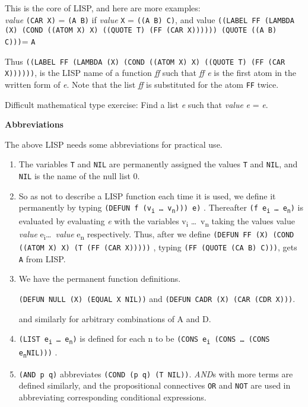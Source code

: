 \documentclass[8pt,letter,twocolumn]{article}
\newcommand{\args}[1] {#1\textsubscript{i} \dots \ #1\textsubscript{n}}
\newcommand{\ei}[0] {e\textsubscript{i}}
\newcommand{\en}[0] {e\textsubscript{n}}
\begin{document}
This is the core of LISP, and here are more examples:  \\

\textit{value} \texttt{(CAR X)} = \texttt{(A B)} if \textit{value} \texttt{X} =
\texttt{((A B) C)}, and value \texttt{((LABEL FF (LAMBDA (X) (COND ((ATOM X) X)
  ((QUOTE T) (FF (CAR X)))))) (QUOTE ((A B) C)))}= \texttt{A}

Thus \texttt{((LABEL FF (LAMBDA (X) (COND ((ATOM X) X) ((QUOTE T) (FF (CAR
  X))))))}, is the LISP name of a function \textit{ff} such that \textit{ff e}
is the first atom in the written form of \textit{e}. Note that the list
\textit{ff} is substituted for the atom \texttt{FF} twice.

Difficult mathematical type exercise: Find a list \textit{e} such that
\textit{value} \textit{e} = \textit{e}.

\vspace*{1\baselineskip}
\textbf{Abbreviations}
\vspace*{1\baselineskip}

The above LISP needs some abbreviations for practical use.

\begin{enumerate}
\setlength\itemsep{0em}

\item The variables \texttt{T} and \texttt{NIL} are permanently assigned the
  values \texttt{T} and \texttt{NIL}, and \texttt{NIL} is the name of the null
  list 0.

\item So as not to describe a LISP function each time it is used, we define it
  permanently by typing \texttt{(DEFUN f (\args{v}))) e)} . Thereafter
  \texttt{(f \args{e})} is evaluated by evaluating \textit{e} with the variables
  \args{v} taking the values value \textit{value} \ei \dots \ \textit{value} \en
  respectively. Thus, after we define \texttt{(DEFUN FF (X) (COND ((ATOM X) X)
    (T (FF (CAR X)))))} , typing \texttt{(FF (QUOTE (CA B) C)))}, gets
  \texttt{A} from LISP.

\item We have the permanent function definitions.

  \texttt{(DEFUN NULL (X) (EQUAL X NIL))} and \texttt{(DEFUN CADR (X) (CAR (CDR
    X)))}.

  and similarly for arbitrary combinations of A and D.

\item \texttt{(LIST \args{e})} is defined for each n to be \texttt{(CONS \ei
    (CONS \dots \ (CONS \en NIL)))} .

\item \texttt{(AND p q)} abbreviates \texttt{(COND (p q) (T NIL))}.
  \textit{AND}s with more terms are defined similarly, and the propositional
  connectives \texttt{OR} and \texttt{NOT} are used in abbreviating
  corresponding conditional expressions.

\end{enumerate}
\end{document}
